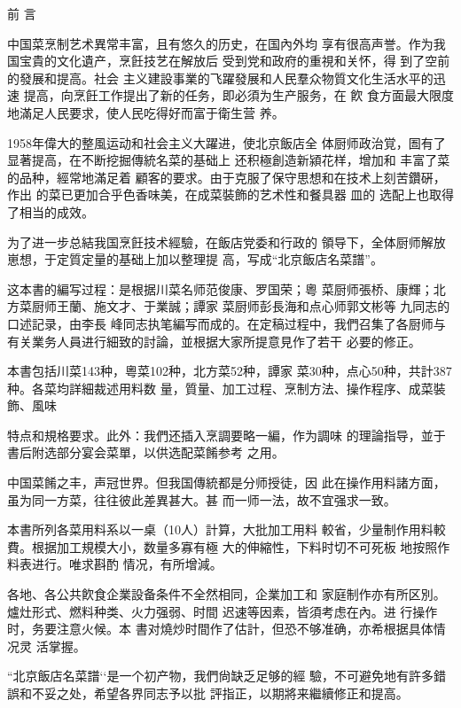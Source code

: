 前 言

中国菜烹制艺术異常丰富，且有悠久的历史，在国內外均 享有很高声誉。作为我国宝貴的文化遺产，烹飪技艺在解放后 受到党和政府的重視和关怀，得
到了空前的發展和提高。社会 主义建設事業的飞躍發展和人民羣众物質文化生活水平的迅速 提高，向烹飪工作提出了新的任务，即必須为生产服务，在
飮 食方面最大限度地滿足人民要求，使人民吃得好而富于衛生营 养。

1958年偉大的整風运动和社会主义大躍进，使北京飯店全 体厨师政治覚，圄有了显著提高，在不断挖掘傳統名菜的基础上 还积極創造新潁花样，增加和
丰富了菜的品种，經常地滿足着 顧客的要求。由于克服了保守思想和在技术上刻苦鑽硏，作出 的菜已更加合乎色香味美，在成菜裝飾的艺术性和餐具器
皿的 选配上也取得了相当的成效。

为了进一步总結我国烹飪技术經驗，在飯店党委和行政的 領导下，全体厨师解放崽想，于定質定量的基础上加以整理提 高，写成“北京飯店名菜譜”。

这本書的編写过程：是根据川菜名师范俊康、罗国荣；粵 菜厨师張桥、康輝；北方菜厨师王蘭、施文才、于業誠；譚家 菜厨师彭長海和点心师郭文彬等
九同志的口述記录，由李長 峰同志执笔編写而成的。在定稿过程中，我們召集了各厨师与 有关業务人員进行細致的討論，並根据大家所提意見作了若干 必要的修正。

本書包括川菜143种，粵菜102种，北方菜52种，譚家 菜30种，点心50种，共計387种。各菜均詳細裁述用料数 量，質量、加工过程、烹制方法、操作程序、成菜裝飾、風味

特点和規格要求。此外：我們还插入烹調要略一編，作为調味 的理論指导，並于書后附选部分宴会菜單，以供选配菜餚参考 之用。

中国菜餚之丰，声冠世界。但我国傳統都是分师授徒，因 此在操作用料諸方面，虽为同一方菜，往往彼此差異甚大。甚 而一师一法，故不宜强求一致。

本書所列各菜用料系以一桌（10人）計算，大批加工用料 較省，少量制作用料較費。根据加工規模大小，数量多寡有極 大的伸縮性，下料时切不可死板
地按照作料表进行。唯求斟酌 情况，有所增減。

各地、各公共飮食企業設备条件不全然相同，企業加工和 家庭制作亦有所区別。爐灶形式、燃料种类、火力强弱、时間 迟速等因素，皆須考虑在內。进
行操作时，务要注意火候。本 書对燒炒时間作了估計，但恐不够准确，亦希根据具体情况灵 活掌握。

“北京飯店名菜譜‘‘是一个初产物，我們尙缺乏足够的經 驗，不可避免地有許多錯誤和不妥之处，希望各界同志予以批 評指正，以期將来繼續修正和提高。
